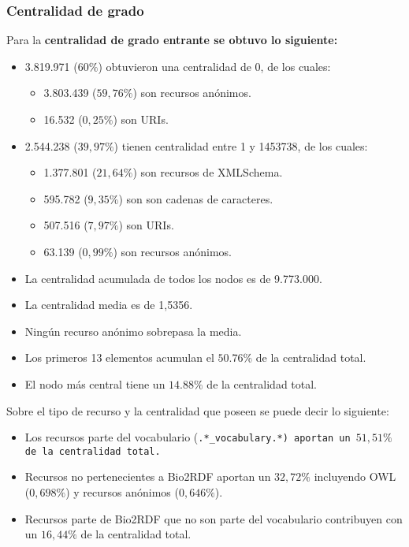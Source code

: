 \subsubsection{Centralidad de grado}
Para la \bf{centralidad de grado entrante} se obtuvo lo siguiente:
\begin{itemize}
  \item 3.819.971 ($60\%$) obtuvieron una centralidad de 0, de los cuales:
    \begin{itemize}
      \item 3.803.439 ($59,76\%$) son recursos anónimos.
      \item 16.532 ($0,25\%$) son URIs.
    \end{itemize}
  \item 2.544.238 ($39,97\%$) tienen centralidad entre 1 y 1453738, de los cuales:
    \begin{itemize}
      \item 1.377.801 ($21,64\%$) son recursos de XMLSchema.
      \item 595.782 ($9,35\%$) son son cadenas de caracteres.
      \item 507.516 ($7,97\%$) son URIs.
      \item 63.139 ($0,99\%$) son recursos anónimos.
    \end{itemize}
  \item La centralidad acumulada de todos los nodos es de 9.773.000.
  \item La centralidad media es de 1,5356.
  \item Ningún recurso anónimo sobrepasa la media.
  \item Los primeros 13 elementos acumulan el $50.76\%$ de la centralidad total.
  \item El nodo más central tiene un $14.88\%$ de la centralidad total.
\end{itemize}
Sobre el tipo de recurso y la centralidad que poseen se puede decir lo
siguiente:
\begin{itemize}
  \item 
    Los recursos parte del vocabulario (\tt{.*\_vocabulary.*}) aportan un 
    $51,51\%$ de la centralidad total.
  \item
    Recursos no pertenecientes a Bio2RDF aportan un $32,72\%$ incluyendo OWL 
    ($0,698\%$) y recursos anónimos ($0,646\%$).
  \item 
    Recursos parte de Bio2RDF que no son parte del vocabulario contribuyen con
    un $16,44\%$ de la centralidad total.
\end{itemize}

